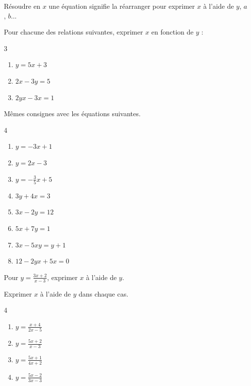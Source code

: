\documentclass[main.tex]{subfiles}
\begin{document}
\begin{cBox} 
	Résoudre en $x$ une équation signifie la réarranger pour exprimer $x$ à l'aide de $y$, $a$, $b$...   
\end{cBox}	 
\begin{example} Pour chacune des relations suivantes, exprimer $x$ en fonction de $y$ :
	\vspace{-0.75em}
	\begin{multicols}{3}
		\begin{enumerate}[label=\alph*),leftmargin =*]
			\item  $y=5x+3$
			\item $2x-3y=5$
			\item $2yx-3x=1$ 
		\end{enumerate}
	\end{multicols}
\end{example}
\vfill 
\begin{exercise} 	Mêmes consignes avec les équations suivantes. \hfill 
	\vspace{-0.75em}	
	\begin{multicols}{4}
		\begin{enumerate}[label=\alph*),leftmargin =*] 
			\item $y=-3x+1$ 
			\item $y=2x-3$ 
			\item $y=-\tfrac{3}{5}x+5$ 
			\item $3y+4x=3$
			\item $3x-2y=12$ 
			\item $5x+7y=1$
			\item $3x-5xy=y+1$
			\item $12-2yx+5x=0$
		\end{enumerate}
	\end{multicols}
\end{exercise} 

\begin{example} Pour $y=\tfrac{3x+2}{x-3}$, exprimer $x$ à l'aide de $y$.\hfill 
	
	
\end{example}
\vfill
\begin{exercise}Exprimer $x$ à l'aide de $y$ dans chaque cas.\hfill 
		\vspace{-0.75em}
	\begin{multicols}{4}
		\begin{enumerate}[label=\alph*),leftmargin =*] 
			\item $y=\frac{x+4}{2x-5}$ 
			\item $y=\frac{5x+2}{x-3}$
			\item $y=\frac{5x+1}{4x+2}$ 
			\item $y=\frac{5x-2}{3x-3}$   
		\end{enumerate}
	\end{multicols}	 
\end{exercise} 
\end{document}
